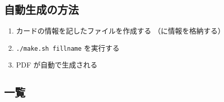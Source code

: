 \documentclass[line_length=22zw,number_of_lines=45,twocolumn]{jlreq}
\begin{document}
\subsection{自動生成の方法}
\begin{enumerate}
	\item カードの情報を記したファイルを作成する
		（に情報を格納する）
	\item \texttt{./make.sh fillname} を実行する
	\item PDF が自動で生成される
\end{enumerate}

\subsection{一覧}
\end{document}
